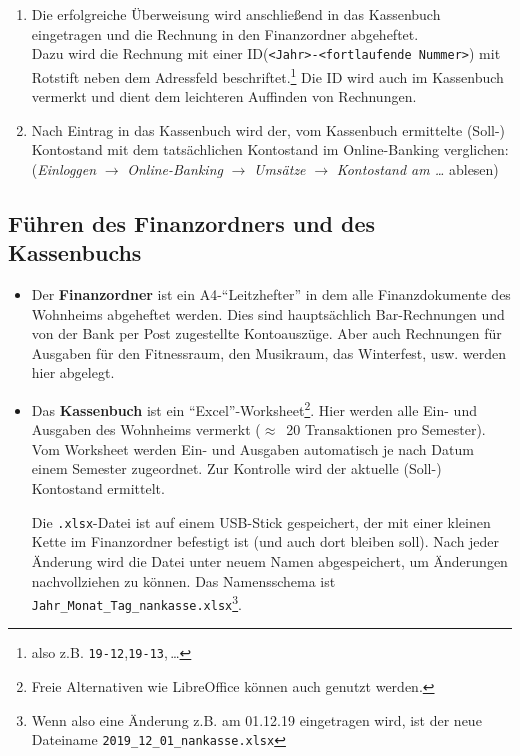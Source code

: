 \documentclass[10pt,a4paper,noendnumber=true]{scrartcl}
\begin{document}
\begin{enumerate}
	\item Die erfolgreiche Überweisung wird anschließend in das Kassenbuch eingetragen und die Rechnung in den Finanzordner abgeheftet.\\Dazu wird die Rechnung mit einer ID(\texttt{<Jahr>-<fortlaufende Nummer>}) mit Rotstift neben dem Adressfeld beschriftet.\footnote{also z.B. \texttt{19-12},\texttt{19-13},\,\ldots} Die ID wird auch im Kassenbuch vermerkt und dient dem leichteren Auffinden von Rechnungen.
	
	\item Nach Eintrag in das Kassenbuch wird der, vom Kassenbuch ermittelte (Soll-) Kontostand mit dem tatsächlichen Kontostand im Online-Banking verglichen:\\(\textit{Einloggen} $\rightarrow$ \textit{Online-Banking} $\rightarrow$ \textit{Umsätze} $\rightarrow$ \textit{Kontostand am \ldots} ablesen)
\end{enumerate}

\subsection{Führen des Finanzordners und des Kassenbuchs}
\begin{itemize}
	\item Der \textbf{Finanzordner} ist ein A4-"`Leitzhefter"' in dem alle Finanzdokumente des Wohnheims abgeheftet werden. Dies sind hauptsächlich Bar-Rechnungen und von der Bank per Post zugestellte Kontoauszüge. Aber auch Rechnungen für Ausgaben für den Fitnessraum, den Musikraum, das Winterfest, usw. werden hier abgelegt.
	
	\item Das \textbf{Kassenbuch} ist ein "`Excel"'-Worksheet\footnote{Freie Alternativen wie LibreOffice können auch genutzt werden.}. Hier werden alle Ein- und Ausgaben des Wohnheims vermerkt ($\approx$~20 Transaktionen pro Semester). Vom Worksheet werden Ein- und Ausgaben automatisch je nach Datum einem Semester zugeordnet. Zur Kontrolle wird der aktuelle (Soll-) Kontostand ermittelt.
	
	Die \texttt{.xlsx}-Datei ist auf einem USB-Stick gespeichert, der mit einer kleinen Kette im Finanzordner befestigt ist (und auch dort bleiben soll). Nach jeder Änderung wird die Datei unter neuem Namen abgespeichert, um Änderungen nachvollziehen zu können. Das Namensschema ist \texttt{Jahr\_Monat\_Tag\_nankasse.xlsx}\footnote{Wenn also eine Änderung z.B. am 01.12.19 eingetragen wird, ist der neue Dateiname \texttt{2019\_12\_01\_nankasse.xlsx}}.
\end{itemize}
\end{document}

